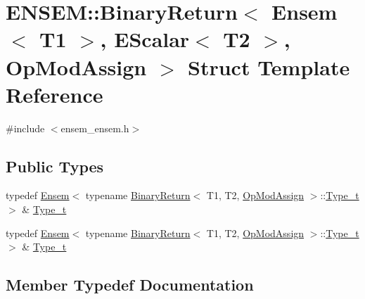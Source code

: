 \hypertarget{structENSEM_1_1BinaryReturn_3_01Ensem_3_01T1_01_4_00_01EScalar_3_01T2_01_4_00_01OpModAssign_01_4}{}\section{E\+N\+S\+EM\+:\+:Binary\+Return$<$ Ensem$<$ T1 $>$, E\+Scalar$<$ T2 $>$, Op\+Mod\+Assign $>$ Struct Template Reference}
\label{structENSEM_1_1BinaryReturn_3_01Ensem_3_01T1_01_4_00_01EScalar_3_01T2_01_4_00_01OpModAssign_01_4}


{\ttfamily \#include $<$ensem\+\_\+ensem.\+h$>$}

\subsection*{Public Types}
\begin{DoxyCompactItemize}
\item 
typedef \mbox{\hyperlink{classENSEM_1_1Ensem}{Ensem}}$<$ typename \mbox{\hyperlink{structENSEM_1_1BinaryReturn}{Binary\+Return}}$<$ T1, T2, \mbox{\hyperlink{structENSEM_1_1OpModAssign}{Op\+Mod\+Assign}} $>$\+::\mbox{\hyperlink{structENSEM_1_1BinaryReturn_3_01Ensem_3_01T1_01_4_00_01EScalar_3_01T2_01_4_00_01OpModAssign_01_4_ae79bfed41fd3b8579919621da1f79095}{Type\+\_\+t}} $>$ \& \mbox{\hyperlink{structENSEM_1_1BinaryReturn_3_01Ensem_3_01T1_01_4_00_01EScalar_3_01T2_01_4_00_01OpModAssign_01_4_ae79bfed41fd3b8579919621da1f79095}{Type\+\_\+t}}
\item 
typedef \mbox{\hyperlink{classENSEM_1_1Ensem}{Ensem}}$<$ typename \mbox{\hyperlink{structENSEM_1_1BinaryReturn}{Binary\+Return}}$<$ T1, T2, \mbox{\hyperlink{structENSEM_1_1OpModAssign}{Op\+Mod\+Assign}} $>$\+::\mbox{\hyperlink{structENSEM_1_1BinaryReturn_3_01Ensem_3_01T1_01_4_00_01EScalar_3_01T2_01_4_00_01OpModAssign_01_4_ae79bfed41fd3b8579919621da1f79095}{Type\+\_\+t}} $>$ \& \mbox{\hyperlink{structENSEM_1_1BinaryReturn_3_01Ensem_3_01T1_01_4_00_01EScalar_3_01T2_01_4_00_01OpModAssign_01_4_ae79bfed41fd3b8579919621da1f79095}{Type\+\_\+t}}
\end{DoxyCompactItemize}


\subsection{Member Typedef Documentation}
\mbox{\label{structENSEM_1_1BinaryReturn_3_01Ensem_3_01T1_01_4_00_01EScalar_3_01T2_01_4_00_01OpModAssign_01_4_ae79bfed41fd3b8579919621da1f79095}} 
